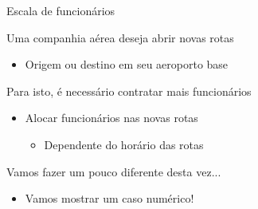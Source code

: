 \documentclass[compress,mathserif]{beamer}
\begin{document}

\begin{frame}{Escala de funcionários}

Uma companhia aérea deseja abrir novas rotas
\begin{itemize}
    \item Origem ou destino em seu aeroporto base
\end{itemize}
 
\vspace{0.5cm}
 
Para isto, é necessário contratar mais funcionários
\begin{itemize}
    \item Alocar funcionários nas novas rotas
    \begin{itemize}
        \item Dependente do horário das rotas
    \end{itemize}
\end{itemize}

\vspace{0.5cm}

Vamos fazer um pouco diferente desta vez... 
\begin{itemize}
    \item Vamos mostrar um caso numérico!
\end{itemize}

\end{frame}

\end{document}
